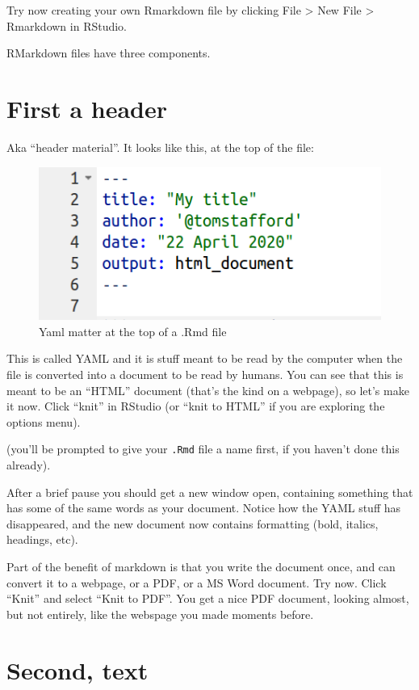 \documentclass[
]{book}
\begin{document}
Try now creating your own Rmarkdown file by clicking File \textgreater{} New File \textgreater{} Rmarkdown in RStudio.

RMarkdown files have three components.

\hypertarget{first-a-header}{%
\section{First a header}\label{first-a-header}}

Aka ``header material''. It looks like this, at the top of the file:

\begin{figure}
\centering
\includegraphics{images/yaml.png}
\caption{Yaml matter at the top of a .Rmd file}
\end{figure}

This is called YAML and it is stuff meant to be read by the computer when the file is converted into a document to be read by humans. You can see that this is meant to be an ``HTML'' document (that's the kind on a webpage), so let's make it now. Click ``knit'' in RStudio (or ``knit to HTML'' if you are exploring the options menu).

(you'll be prompted to give your \texttt{.Rmd} file a name first, if you haven't done this already).

After a brief pause you should get a new window open, containing something that has some of the same words as your document. Notice how the YAML stuff has disappeared, and the new document now contains formatting (bold, italics, headings, etc).

Part of the benefit of markdown is that you write the document once, and can convert it to a webpage, or a PDF, or a MS Word document. Try now. Click ``Knit'' and select ``Knit to PDF''. You get a nice PDF document, looking almost, but not entirely, like the webspage you made moments before.

\hypertarget{second-text}{%
\section{Second, text}\label{second-text}}
\end{document}
